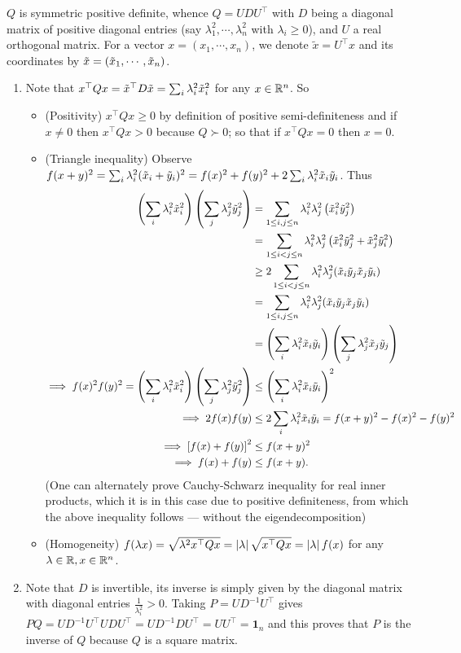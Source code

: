 \soln
$Q$ is symmetric positive definite, whence $Q=UDU^\top$ with $D$ being a diagonal matrix of positive diagonal entries (say $\lambda_1^2, \cdots,\lambda_n^2$ with $\lambda_{i}\geq 0$), and $U$ a real orthogonal matrix. For a vector $x = (x_1,\cdots,x_n)$, we denote $\tilde x=U^\top x$ and its coordinates by ${\tilde{x}}=({\tilde{x}}_1,\cdots,{\tilde{x}}_n)$.
\begin{enumerate}[leftmargin=*]
\item Note that $x^\top Qx = {\tilde{x}}^\top D {\tilde{x}} = \sum_i \lambda_i^2{\tilde{x}}_i^{2}$ for any $x\in\mathbb{R}^n$. So \begin{itemize}[leftmargin=*]
\item (Positivity) $x^\top Q x \geq 0$ by definition of positive semi-definiteness and if $x \neq 0$ then $x^\top Qx > 0$ because $Q\succ 0$; so that if $x^\top Q x=0$ then $x=0$.
\item (Triangle inequality) Observe $f(x+y)^2= \sum_i \lambda_i^2({\tilde{x}}_i+{\tilde{y}}_i)^2 = f(x)^2 + f(y)^2 + 2\sum_i \lambda_i^2{\tilde{x}}_i{\tilde{y}}_i$.
Thus \begin{align*}
\left(\sum_i\lambda_i^2{\tilde{x}}_i^2\right)\left(\sum_j\lambda_j^2{\tilde{y}}_j^2\right)
&=\sum_{1\leq i,j\leq n} \lambda_i^2\lambda_j^2 \left({\tilde{x}}_i^2{\tilde{y}}_j^2\right) \\
&= \sum_{1\leq i<j\leq n} \lambda_i^2\lambda_j^2 \left({\tilde{x}}_i^2{\tilde{y}}_j^2+{\tilde{x}}_j^2{\tilde{y}}_i^2\right)\\
&\geq 2\sum_{1\leq i<j\leq n} \lambda_i^2\lambda_j^2 ({\tilde{x}}_i{\tilde{y}}_j{\tilde{x}}_j{\tilde{y}}_i)\\
&= \sum_{1\leq i,j\leq n} \lambda_i^2\lambda_j^2 ({\tilde{x}}_i{\tilde{y}}_j{\tilde{x}}_j{\tilde{y}}_i)\\
&= \left(\sum_i\lambda_i^2{\tilde{x}}_i{\tilde{y}}_i\right)\left(\sum_j\lambda_j^2{\tilde{x}}_j{\tilde{y}}_j\right)\\
\implies f(x)^2f(y)^2 = \left(\sum_i\lambda_i^2{\tilde{x}}_i^2\right)\left(\sum_j\lambda_j^2{\tilde{y}}_j^2\right) &\leq \left(\sum_i\lambda_i^2{\tilde{x}}_i{\tilde{y}}_i\right)^2\\
\implies 2f(x)f(y)  &\leq 2\sum_i\lambda_i^2{\tilde{x}}_i{\tilde{y}}_i = f(x+y)^2-f(x)^2-f(y)^2\\
\implies \left[f(x) + f(y)\right]^2 &\leq f(x+y)^2\\
\implies f(x) + f(y) &\leq f(x+y).
\end{align*}
(One can alternately prove Cauchy-Schwarz inequality for real inner products, which it is in this case due to positive definiteness, from which the above inequality follows --- without the eigendecomposition)
\item (Homogeneity) $f(\lambda x) = \sqrt{\lambda^2 x^\top Qx} = \left| \lambda \right|\sqrt{x^\top Qx} = \left| \lambda \right| f(x)$ for any $\lambda\in\mathbb{R},x\in\mathbb{R}^n$.
\end{itemize}
\item  Note that $D$ is invertible, its inverse is simply given by the diagonal matrix with diagonal entries $\frac{1}{\lambda_i^{2}}>0$. Taking $P = UD^{-1}U^\top$ gives $PQ = UD^{-1}U^\top UDU^\top = UD^{-1}DU^\top = UU^\top = \pmb 1_n$ and this proves that $P$ is the inverse of $Q$ because $Q$ is a square matrix. 


\end{enumerate}
